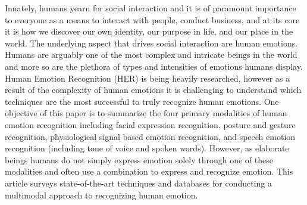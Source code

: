 Innately, humans yearn for social interaction and it is of paramount importance to everyone as a means to interact with people, conduct business, and at its core it is how we discover our own identity, our purpose in life, and our place in the world. The underlying aspect that drives social interaction are human emotions. Humans are arguably one of the most complex and intricate beings in the world and more so are the plethora of types and intensities of emotions humans display. Human Emotion Recognition (HER) is being heavily researched, however as a result of the complexity of human emotions it is challenging to understand which techniques are the most successful to truly recognize human emotions. One objective of this paper is to summarize the four primary modalities of human emotion recognition including facial expression recognition, posture and gesture recognition, physiological signal based emotion recognition, and speech emotion recognition (including tone of voice and spoken words). However, as elaborate beings humans do not simply express emotion solely through one of these modalities and often use a combination to express and recognize emotion. This article surveys state-of-the-art techniques and databases for conducting a multimodal approach to recognizing human emotion.
